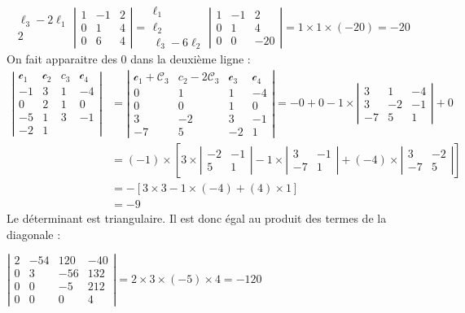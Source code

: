 {{$$\begin{gathered}
		\ell_3-2 \ell_1 \\
		2
	\end{gathered}\left|\begin{array}{ccc}
		1 & -1 & 2 \\
		0 & 1 & 4 \\
		0 & 6 & 4
	\end{array}\right|=\begin{gathered}
		\ell_1 \\
		\ell_2 \\
		\ell_3-6 \ell_2
	\end{gathered}\left|\begin{array}{ccc}
		1 & -1 & 2 \\
		0 & 1 & 4 \\
		0 & 0 & -20
	\end{array}\right|=1 \times 1 \times(-20)=-20
	$$
	On fait apparaitre des 0 dans la deuxième ligne :
	$$
	\begin{aligned}
		\left|\begin{array}{cccc}
			\mathcal{c}_1 & \mathcal{c}_2 & c_3 & \mathcal{c}_4 \\
			-1 & 3 & 1 & -4 \\
			0 & 2 & 1 & 0 \\
			-5 & 1 & 3 & -1 \\
			-2 & 1
		\end{array}\right| & =\left|\begin{array}{cccc}
			\mathcal{c}_1+\mathcal{C}_3 & c_2-2 \mathcal{C}_3 & \mathcal{c}_3 & \mathcal{c}_4 \\
			0 & 1 & 1 & -4 \\
			0 & 0 & 1 & 0 \\
			3 & -2 & 3 & -1 \\
			-7 & 5 & -2 & 1
		\end{array}\right|=-0+0-1 \times\left|\begin{array}{ccc}
			3 & 1 & -4 \\
			3 & -2 & -1 \\
			-7 & 5 & 1
		\end{array}\right|+0 \\
		& =(-1) \times\left[3 \times\left|\begin{array}{cc}
			-2 & -1 \\
			5 & 1
		\end{array}\right|-1 \times\left|\begin{array}{cc}
			3 & -1 \\
			-7 & 1
		\end{array}\right|+(-4) \times\left|\begin{array}{cc}
			3 & -2 \\
			-7 & 5
		\end{array}\right|\right] \\
		& =-[3 \times 3-1 \times(-4)+(4) \times 1] \\
		& =-9
	\end{aligned}
	$$
	Le déterminant est triangulaire. Il est donc égal au produit des termes de la diagonale :
	
	$\left|\begin{array}{cccc}2 & -54 & 120 & -40 \\ 0 & 3 & -56 & 132 \\ 0 & 0 & -5 & 212 \\ 0 & 0 & 0 & 4\end{array}\right|=2 \times 3 \times(-5) \times 4=-120$
 }}
